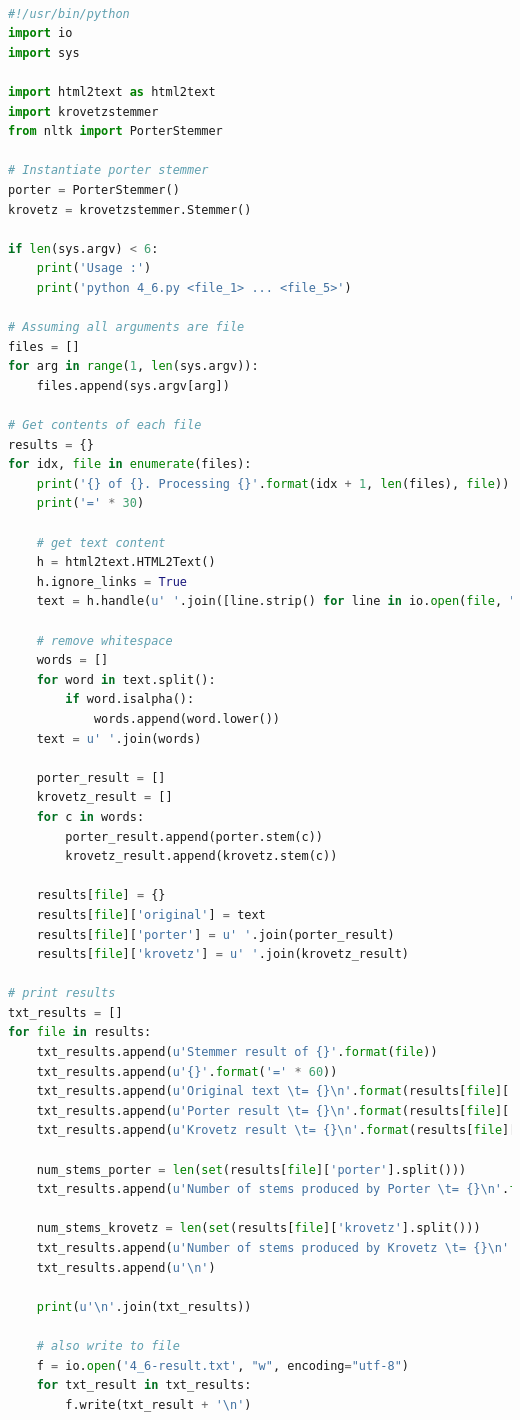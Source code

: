 \documentclass[letterpaper,11pt]{article}
\begin{document}
\begin{lstlisting}[language=python, caption={Source code for stemming document using Porter Stemmer and Krovetz Stemmer}, label={lst:porter-krovetz}]

#!/usr/bin/python
import io
import sys

import html2text as html2text
import krovetzstemmer
from nltk import PorterStemmer

# Instantiate porter stemmer
porter = PorterStemmer()
krovetz = krovetzstemmer.Stemmer()

if len(sys.argv) < 6:
    print('Usage :')
    print('python 4_6.py <file_1> ... <file_5>')

# Assuming all arguments are file
files = []
for arg in range(1, len(sys.argv)):
    files.append(sys.argv[arg])

# Get contents of each file
results = {}
for idx, file in enumerate(files):
    print('{} of {}. Processing {}'.format(idx + 1, len(files), file))
    print('=' * 30)

    # get text content
    h = html2text.HTML2Text()
    h.ignore_links = True
    text = h.handle(u' '.join([line.strip() for line in io.open(file, "r", encoding="utf-8").readlines()]))

    # remove whitespace
    words = []
    for word in text.split():
        if word.isalpha():
            words.append(word.lower())
    text = u' '.join(words)

    porter_result = []
    krovetz_result = []
    for c in words:
        porter_result.append(porter.stem(c))
        krovetz_result.append(krovetz.stem(c))

    results[file] = {}
    results[file]['original'] = text
    results[file]['porter'] = u' '.join(porter_result)
    results[file]['krovetz'] = u' '.join(krovetz_result)

# print results
txt_results = []
for file in results:
    txt_results.append(u'Stemmer result of {}'.format(file))
    txt_results.append(u'{}'.format('=' * 60))
    txt_results.append(u'Original text \t= {}\n'.format(results[file]['original']))
    txt_results.append(u'Porter result \t= {}\n'.format(results[file]['porter']))
    txt_results.append(u'Krovetz result \t= {}\n'.format(results[file]['krovetz']))

    num_stems_porter = len(set(results[file]['porter'].split()))
    txt_results.append(u'Number of stems produced by Porter \t= {}\n'.format(num_stems_porter))

    num_stems_krovetz = len(set(results[file]['krovetz'].split()))
    txt_results.append(u'Number of stems produced by Krovetz \t= {}\n'.format(num_stems_krovetz))
    txt_results.append(u'\n')

    print(u'\n'.join(txt_results))

    # also write to file
    f = io.open('4_6-result.txt', "w", encoding="utf-8")
    for txt_result in txt_results:
        f.write(txt_result + '\n')

\end{lstlisting}
\end{document}
